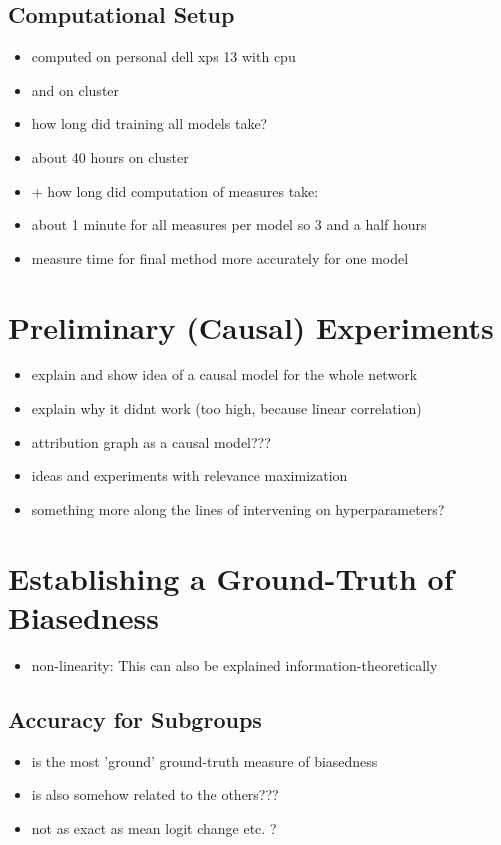 \subsection{Computational Setup}
\label{section:setup}
\begin{itemize}
    \item computed on personal dell xps 13 with cpu
    \item and on cluster 
    \item how long did training all models take?
    \item about 40 hours on cluster
    \item + how long did computation of measures take:
    \item about 1 minute for all measures per model so 3 and a half hours
    \item measure time for final method more accurately for one model 
\end{itemize}

\section{Preliminary (Causal) Experiments} 
\begin{itemize}
    \item explain and show idea of a causal model for the whole network
    \item explain why it didnt work (too high, because linear correlation)
    \item attribution graph as a causal model???
    \item ideas and experiments with relevance maximization
    \item something more along the lines of intervening on hyperparameters? \cite{Karimi2023}
\end{itemize}

\section{Establishing a Ground-Truth of Biasedness}
\begin{itemize}
    \item non-linearity: This can also be explained information-theoretically 
\end{itemize}

\subsection{Accuracy for Subgroups}
\begin{itemize}
    \item is the most 'ground' ground-truth measure of biasedness
    \item is also somehow related to the others??? 
    \item not as exact as mean logit change etc. ?
\end{itemize}

